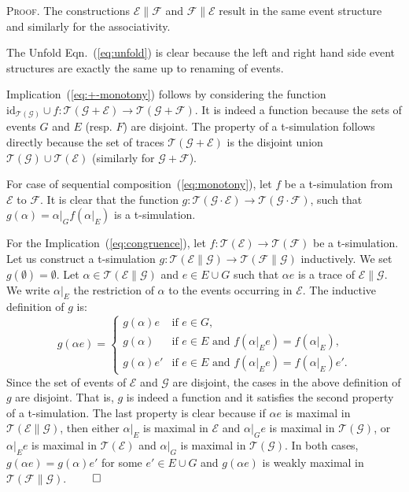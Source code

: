 \documentclass[review]{elsart}
\newenvironment{proof}{\par
\noindent
\textsc{Proof. }
\noindent}{\hfill\(\qed\)}
\newcommand{\EE}{\mathcal{E}}
\newcommand{\FF}{\mathcal{F}}
\newcommand{\GG}{\mathcal{G}}
\newcommand{\TT}{\mathcal{T}}
\newcommand{\Eqn}[1]{Eqn.~(\ref{#1})}
\begin{document}
\begin{proof}
The constructions $\EE\|\FF$ and $\FF\|\EE$ result in the same event structure and similarly for the associativity. 



The Unfold \Eqn{eq:unfold} is clear because the left and right hand side event structures are exactly the same up to renaming of events.

Implication~(\ref{eq:+-monotony}) follows by considering the function $\mathrm{id}_{\TT(\GG)}{\cup} f{:}\TT(\GG{+}\EE){\to}\TT(\GG {+} \FF)$. It is indeed a function because the sets of events $G$ and $E$ (resp. $F$) are disjoint. The property of a t-simulation follows directly because the set of traces $\TT(\GG{+}\EE)$ is the disjoint union $\TT(\GG){\cup}\TT(\EE)$ (similarly for $\GG{+}\FF$).

For case of sequential composition~(\ref{eq:monotony}), let $f$ be a t-simulation from $\EE$ to $\FF$. It is clear that the function $g{:}\TT(\GG{\cdot}\EE){\to}\TT(\GG{\cdot}\FF)$, such that $g(\alpha) {=} \alpha|_Gf(\alpha|_E)$ is a t-simulation.

For the Implication~(\ref{eq:congruence}), let $f{:}\TT(\EE){\to}\TT(\FF)$ be a t-simulation. Let us construct a t-simulation $g{:}\TT(\EE\|\GG){\to}\TT(\FF\|\GG)$ inductively. We set $g(\emptyset) {=} \emptyset$. Let $\alpha{\in} \TT(\EE\|\GG)$ and $e{\in} E{\cup} G$ such that $\alpha e$ is a trace of $\EE\|\GG$. We write $\alpha|_E$ the restriction of $\alpha$ to the events occurring in $\EE$. The inductive definition of $g$ is:
\begin{displaymath}
g(\alpha e) = \left\lbrace
\begin{array}{cl}
g(\alpha)e & \textrm{if } e{\in} G,\\
g(\alpha) & \textrm {if } e{\in} E\textrm{ and } f(\alpha|_Ee) {=} f(\alpha|_E), \\
g(\alpha)e' & \textrm{if } e{\in} E\textrm{ and } f(\alpha|_Ee) {=} f(\alpha|_E)e'.
\end{array}\right.
\end{displaymath}
Since the set of events of $\EE$ and $\GG$ are disjoint, the cases in the above definition of $g$ are disjoint. That is, $g$ is indeed a function and it satisfies the second property of a t-simulation. The last property is clear because if $\alpha e$ is maximal in $\TT(\EE\|\GG)$, then either $\alpha|_E$ is maximal in $\EE$ and $\alpha|_Ge$ is maximal in $\TT(\GG)$, or $\alpha|_Ee$ is maximal in $\TT(\EE)$ and $\alpha|_G$ is maximal in $\TT(\GG)$. In both cases, $g(\alpha e) {=} g(\alpha)e'$ for some $e'{\in} E{\cup} G$ and $g(\alpha e)$ is weakly maximal in $\TT(\FF\|\GG)$.
\end{proof}
\end{document}
